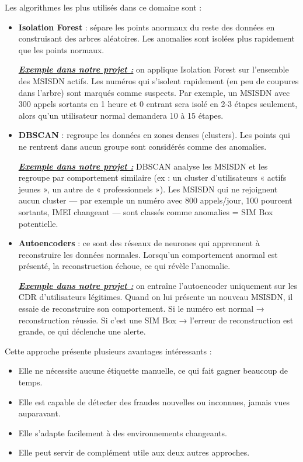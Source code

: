 \documentclass[12pt, oneside, a4paper]{report}
\begin{document}
Les algorithmes les plus utilisés dans ce domaine sont :
\begin{itemize}
\item \textbf{Isolation Forest} : sépare les points anormaux du reste des données en construisant des arbres aléatoires. Les anomalies sont isolées plus rapidement que les points normaux.


\vspace{0.3cm}
\underline{\textit{\textbf{Exemple dans notre projet :}}} on applique Isolation Forest sur l'ensemble des MSISDN actifs. Les numéros qui s'isolent rapidement (en peu de coupures dans l'arbre) sont marqués comme suspects. Par exemple, un MSISDN avec 300 appels sortants en 1 heure et 0 entrant sera isolé en 2-3 étapes seulement, alors qu'un utilisateur normal demandera 10 à 15 étapes.

\vspace{0.3cm}
\item \textbf{DBSCAN} : regroupe les données en zones denses (clusters). Les points qui ne rentrent dans aucun groupe sont considérés comme des anomalies.

\underline{\textit{\textbf{Exemple dans notre projet :}}} DBSCAN analyse les MSISDN et les regroupe par comportement similaire (ex : un cluster d'utilisateurs « actifs jeunes », un autre de « professionnels »). Les MSISDN qui ne rejoignent aucun cluster — par exemple un numéro avec 800 appels/jour, 100 pourcent sortants, IMEI changeant — sont classés comme anomalies = SIM Box potentielle.

\vspace{0.3cm}
\item \textbf{Autoencoders} : ce sont des réseaux de neurones qui apprennent à reconstruire les données normales. Lorsqu'un comportement anormal est présenté, la reconstruction échoue, ce qui révèle l'anomalie.

\underline{\textit{\textbf{Exemple dans notre projet :}}} on entraîne l'autoencoder uniquement sur les CDR d'utilisateurs légitimes. Quand on lui présente un nouveau MSISDN, il essaie de reconstruire son comportement. Si le numéro est normal → reconstruction réussie. Si c'est une SIM Box → l'erreur de reconstruction est grande, ce qui déclenche une alerte.
\end{itemize}

\vspace{0.3cm}
Cette approche présente plusieurs avantages intéressants :
\begin{itemize}
\item Elle ne nécessite aucune étiquette manuelle, ce qui fait gagner beaucoup de temps.
\item Elle est capable de détecter des fraudes nouvelles ou inconnues, jamais vues auparavant.
\item Elle s'adapte facilement à des environnements changeants.
\item Elle peut servir de complément utile aux deux autres approches.
\end{itemize}
\end{document}
